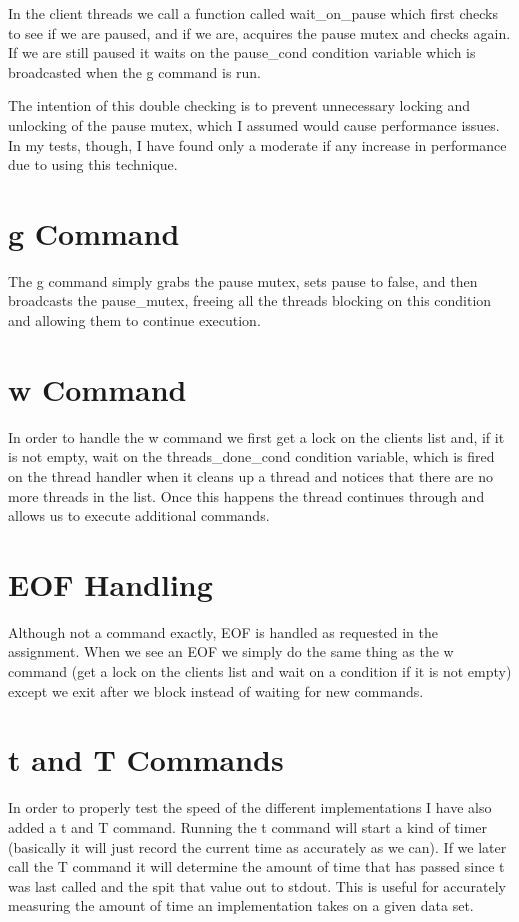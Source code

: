 \documentclass[paper=a4, fontsize=11pt]{scrartcl} %
\numberwithin{equation}{section} %
\numberwithin{figure}{section} %
\numberwithin{table}{section} %
\begin{document}
In the client threads we call a function called wait\_on\_pause which first checks to see if we are paused, and if we are, acquires the pause mutex and checks again.  If we are still paused it waits on the pause\_cond condition variable which is broadcasted when the g command is run.

The intention of this double checking is to prevent unnecessary locking and unlocking of the pause mutex, which I assumed would cause performance issues.  In my tests, though, I have found only a moderate if any increase in performance due to using this technique.

\section{g Command}

The g command simply grabs the pause mutex, sets pause to false, and then broadcasts the pause\_mutex, freeing all the threads blocking on this condition and allowing them to continue execution.

\section{w Command}

In order to handle the w command we first get a lock on the clients list and, if it is not empty, wait on the threads\_done\_cond condition variable, which is fired on the thread handler when it cleans up a thread and notices that there are no more threads in the list.  Once this happens the thread continues through and allows us to execute additional commands.

\section{EOF Handling}

Although not a command exactly, EOF is handled as requested in the assignment.  When we see an EOF we simply do the same thing as the w command (get a lock on the clients list and wait on a condition if it is not empty) except we exit after we block instead of waiting for new commands.

\section{t and T Commands}

In order to properly test the speed of the different implementations I have also added a t and T command.  Running the t command will start a kind of timer (basically it will just record the current time as accurately as we can). If we later call the T command it will determine the amount of time that has passed since t was last called and the spit that value out to stdout. This is useful for accurately measuring the amount of time an implementation takes on a given data set.
\end{document}
